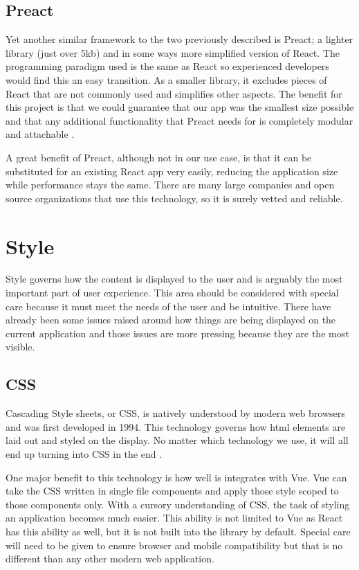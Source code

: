\documentclass[draftclsnofoot,onecolumn,journal,letterpaper,compsoc,10pt]{IEEEtran}
\begin{document}
        \subsection{Preact}
        Yet another similar framework to the two previously described is Preact; a lighter library (just over 5kb) and in some ways more simplified version of React. The programming paradigm used is the same as React so experienced developers would find this an easy transition. As a smaller library, it excludes pieces of React that are not commonly used and simplifies other aspects. The benefit for this project is that we could guarantee that our app was the smallest size possible and that any additional functionality that Preact needs for is completely modular and attachable \cite{preact}.
        
        A great benefit of Preact, although not in our use case, is that it can be substituted for an existing React app very easily, reducing the application size while performance stays the same. There are many large companies and open source organizations that use this technology, so it is surely vetted and reliable.

    \section{Style}
    Style governs how the content is displayed to the user and is arguably the most important part of user experience. This area should be considered with special care because it must meet the needs of the user and be intuitive. There have already been some issues raised around how things are being displayed on the current application and those issues are more pressing because they are the most visible.
        \subsection{CSS}
        Cascading Style sheets, or CSS, is natively understood by modern web browsers and was first developed in 1994. This technology governs how html elements are laid out and styled on the display. No matter which technology we use, it will all end up turning into CSS in the end \cite{css}. 
        
        One major benefit to this technology is how well is integrates with Vue. Vue can take the CSS written in single file components and apply those style scoped to those components only. With a cursory understanding of CSS, the task of styling an application becomes much easier. This ability is not limited to Vue as React has this ability as well, but it is not built into the library by default. Special care will need to be given to ensure browser and mobile compatibility but that is no different than any other modern web application.
\end{document}
